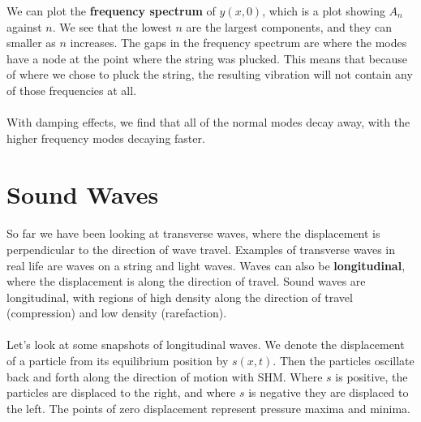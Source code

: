 \documentclass[../classical_mechanics.tex]{subfiles}
\begin{document}
        We can plot the \textbf{frequency spectrum} of $y(x,0)$, which is a plot showing $A_n$ against $n$.
        We see that the lowest $n$ are the largest components, and they can smaller as $n$ increases.
        The gaps in the frequency spectrum are where the modes have a node at the point where the string was plucked.
        This means that because of where we chose to pluck the string, the resulting vibration will not contain any of those frequencies at all.

        \paragraph{}
        With damping effects, we find that all of the normal modes decay away, with the higher frequency modes decaying faster.

    \section{Sound Waves}
        \paragraph{}
        So far we have been looking at transverse waves, where the displacement is perpendicular to the direction of wave travel.
        Examples of transverse waves in real life are waves on a string and light waves.
        Waves can also be \textbf{longitudinal}, where the displacement is along the direction of travel.
        Sound waves are longitudinal, with regions of high density along the direction of travel (compression) and low density (rarefaction).
        
        \paragraph{}
        Let's look at some snapshots of longitudinal waves.
        We denote the displacement of a particle from its equilibrium position by $s(x,t)$.
        Then the particles oscillate back and forth along the direction of motion with SHM.
        Where $s$ is positive, the particles are displaced to the right, and where $s$ is negative they are displaced to the left.
        The points of zero displacement represent pressure maxima and minima.
\end{document}
